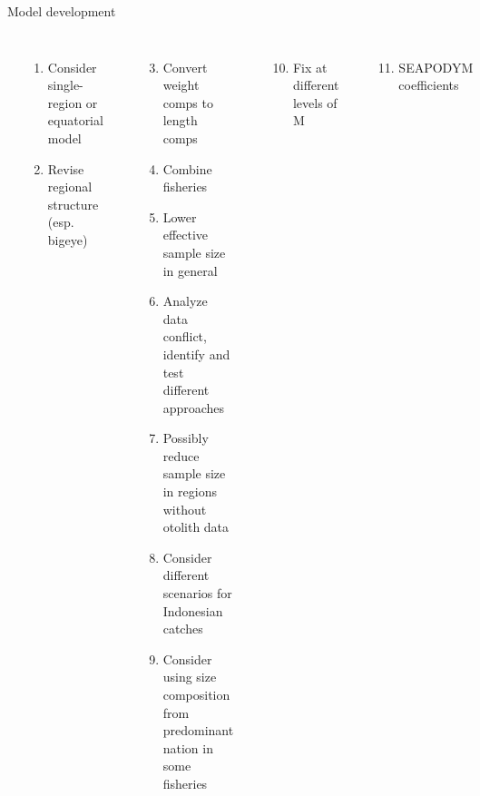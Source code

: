 \documentclass[aspectratio=169]{beamer}
\begin{document}
\begin{frame}{Model development}\fns
  \vspace{-1ex}
  \begin{columns}[T]
    \\[-0.8ex]
    \begin{enumerate}
      \item Consider single-region or equatorial model\\[-0.5ex]
      \item Revise regional structure (esp. bigeye)\\[1.5ex]
    \end{enumerate}
    \\[-0.8ex]
    \begin{enumerate}\setcounter{enumi}{2}
      \item Convert weight comps to length comps\\[-0.5ex]
      \item Combine fisheries\\[-0.5ex]
      \item Lower effective sample size in general\\[-0.5ex]
      \item Analyze data conflict, identify and test different
      approaches\\[-0.5ex]
      \item Possibly reduce sample size in regions without otolith
      data\\[-0.5ex]
      \item Consider different scenarios for Indonesian catches
      \item Consider using size composition from predominant nation in some
      fisheries
    \end{enumerate}
    \\[-0.8ex]
    \begin{enumerate}\setcounter{enumi}{9}
      \item Fix at different levels of M\\[1.2ex]
    \end{enumerate}
    \\[-0.8ex]
    \begin{enumerate}\setcounter{enumi}{10}
      \item SEAPODYM coefficients\\[1.2ex]
    \end{enumerate}

\end{columns}
\end{frame}
\end{document}
